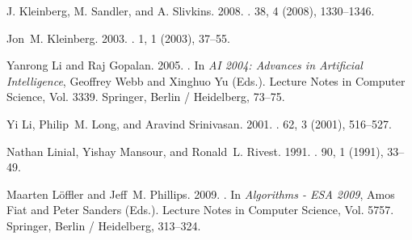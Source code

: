 \begin{thebibliography}{00}
{J. Kleinberg}, {M. Sandler}, {and} {A. Slivkins}. 2008.
\newblock {}.
 {38}, 4 (2008), 1330--1346.


{Jon~M. Kleinberg}. 2003.
\newblock {}.
 {1}, 1 (2003), 37--55.


{Yanrong Li} {and} {Raj Gopalan}. 2005.
\newblock {}.
\newblock In {\em AI 2004: Advances in Artificial Intelligence}, {Geoffrey
  Webb} {and} {Xinghuo Yu} (Eds.). Lecture Notes in Computer Science, Vol.
  3339. Springer, Berlin / Heidelberg, 73--75.


{Yi Li}, {Philip~M. Long}, {and} {Aravind Srinivasan}. 2001.
\newblock {}.
 {62}, 3 (2001), 516--527.


{Nathan Linial}, {Yishay Mansour}, {and} {Ronald~L. Rivest}. 1991.
\newblock {}.
 {90}, 1 (1991), 33--49.
%

{Maarten L\"{o}ffler} {and} {Jeff~M. Phillips}. 2009.
\newblock {}.
\newblock In {\em Algorithms - ESA 2009}, {Amos Fiat} {and} {Peter Sanders}
  (Eds.). Lecture Notes in Computer Science, Vol. 5757. Springer, Berlin /
  Heidelberg, 313--324.



\end{thebibliography}
